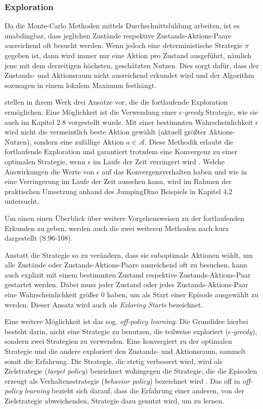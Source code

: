 \subsubsection{Exploration}\label{sec:exploration}
Da die Monte-Carlo Methoden mittels Durchschnittsbildung arbeiten, ist es unabdingbar, dass jeglichen Zustände respektive Zustands-Aktions-Paare ausreichend oft besucht werden. Wenn jedoch eine deterministische Strategie $\pi$ gegeben ist, dann wird immer nur eine Aktion pro Zustand ausgeführt, nämlich jene mit dem derzeitigen höchsten, geschätzten Nutzen. Dies sorgt dafür, dass der Zustands- und Aktionsraum nicht ausreichend erkundet wird und der Algorithm sozusagen in einem lokalem Maximum festhängt.
\par 
\cite{Sutton1998} stellen in ihrem Werk drei Ansatze vor, die die fortlaufende Exploration ermöglichen. Eine Möglichkeit ist die Verwendung einer $\epsilon$\textit{-greedy} Strategie, wie sie auch im Kapitel 2.8 vorgestellt wurde. Mit einer bestimmten Wahrscheinlichkeit $\epsilon$ wird nicht die vermeintlich beste Aktion gewählt (aktuell größter  Aktions-Nutzen), sondern eine zufällige Aktion $a \in \mathcal{A}$. Diese Methodik erlaubt die fortlaufende Exploration und garantiert trotzdem eine Konvergenz zu einer optimalen Strategie, wenn $\epsilon$ im Laufe der Zeit verringert wird \cite[S.~201]{Sutton1998}. Welche Auswirkungen die Werte von $\epsilon$ auf das Konvergenzverhalten haben und wie in eine \glqq Verringerung im Laufe der Zeit \grqq{} aussehen kann, wird im Rahmen der praktischen Umsetzung anhand des JumpingDino Beispiels in Kapitel 4.2 untersucht.
\par 
Um einen einen Überblick über weitere Vorgehensweisen zu der fortlaufenden Erkunden zu geben, werden auch die zwei weiteren Methoden nach \cite{Sutton1998} kurz dargestellt (S.96-108). 
\par 
Anstatt die Strategie so zu verändern, dass sie suboptimale Aktionen wählt, um alle Zustände oder Zustands-Aktions-Paare ausreichend oft zu besuchen, kann auch explizit mit einem bestimmten Zustand respektive Zustands-Aktions-Paar gestartet werden. Dabei muss jeder Zustand oder jedes Zustands-Aktions-Paar eine Wahrscheinlichkeit größer 0 haben, um als Start einer Episode ausgewählt zu werden. Dieser Ansatz wird auch als \textit{Exloring Starts} bezeichnet.
\par
Eine weitere Möglichkeit ist das sog. \textit{off-policy learning}. Die Grundidee hierbei besteht darin, nicht eine Strategie zu benutzen, die teilweise exploriert ($\epsilon$\textit{-greedy}), sondern zwei Strategien zu verwenden. Eine konvergiert zu der optimalen Strategie und die andere exploriert den Zustands- und Aktionsraum, sammelt somit die Erfahrung. Die Strategie, die stetig verbessert wird, wird als Zielstrategie (\textit{target policy}) bezeichnet wohingegen die Strategie, die die Episoden erzeugt als Verhaltensstrategie (\textit{behavior policy}) bezeichnet wird \cite[S.~103]{Sutton1998}. Das \glqq off \grqq{} in \textit{off-policy learning} bezieht sich darauf, dass die Erfahrung einer anderen, von der Zielstrategie abweichenden, Strategie dazu genutzt wird, um zu lernen.
\pagebreak
